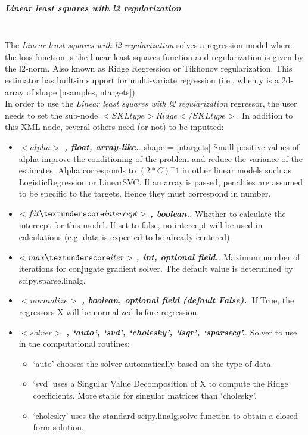 \subparagraph{Linear least squares with l2 regularization}
\mbox{}
\\The \textit{Linear least squares with l2 regularization} solves a regression model where the loss function is the linear least squares function and regularization is given by the l2-norm. Also known as Ridge Regression or Tikhonov regularization. This estimator has built-in support for multi-variate regression (i.e., when y is a 2d-array of shape [n\textunderscore samples, n\textunderscore targets]).
\\In order to use the \textit{Linear least squares with l2 regularization} regressor, the user needs to set the sub-node $<SKLtype>Ridge</SKLtype>$.
In addition to this XML node, several others need (or not) to be inputted:
\begin{itemize}
  \item $<alpha>$ \textbf{\textit{, float, array-like.}}. shape = [n\textunderscore targets] Small positive values of alpha improve the conditioning of the problem and reduce the variance of the estimates. Alpha corresponds to $(2*C)^-1$ in other linear models such as LogisticRegression or LinearSVC. If an array is passed, penalties are assumed to be specific to the targets. Hence they must correspond in number.
  \item $<fit\textunderscore intercept>$ \textbf{\textit{, boolean.}}. Whether to calculate the intercept for this model. If set to false, no intercept will be used in calculations (e.g. data is expected to be already centered).
  \item $<max\textunderscore iter>$ \textbf{\textit{, int, optional field.}}. Maximum number of iterations for conjugate gradient solver. The default value is determined by scipy.sparse.linalg.
  \item $<normalize>$ \textbf{\textit{, boolean, optional field (default False).}}. If True, the regressors X will be normalized before regression.
  \item $<solver>$ \textbf{\textit{, {‘auto’, ‘svd’, ‘cholesky’, ‘lsqr’, ‘sparse\textunderscore cg’}.}}. Solver to use in the computational routines:
				\begin{itemize}
				\item‘auto’ chooses the solver automatically based on the type of data.
				\item‘svd’ uses a Singular Value Decomposition of X to compute the Ridge coefficients. More stable for singular matrices than ‘cholesky’.
				\item‘cholesky’ uses the standard scipy.linalg.solve function to obtain a closed-form solution.

\end{itemize}
\end{itemize}
